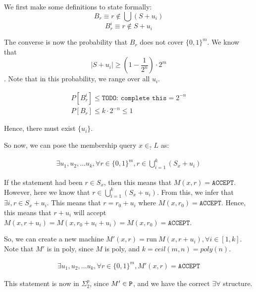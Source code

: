 We first make some definitions to state formally: 
$$B_r \equiv r \notin \bigcup (S + u_i)$$
 $$B_r^i \equiv r \notin S + u_i$$

The converse is now the probability that $B_r$ does not cover $\{0, 1\}^m$.  
We know that $$|S + u_i| \geq (1 - \frac{1}{2^n}) \cdot 2^m$$.
Note that in this probability, we range over all $u_i$.

\begin{align*}
    P[B_r^i] \leq \texttt{TODO: complete this} = 2^{-n} \\
    P[B_r] \leq  k \cdot 2^{-n} \leq 1
\end{align*}

Hence, there must exist $\{ u_i \}$.


So now, we can pose the membership query $x \in_? L$ as:

\begin{align*}
    \exists u_1, u_2, \dots u_k, \forall r \in \{0, 1\}^m, r \in \bigcup_{i = 1}^k (S_x + u_i)
\end{align*}

If the statement had been $r \in S_x$, then this means that $M(x, r) = \texttt{ACCEPT}$.
However, here we know that $r \in \bigcup_{i = 1}^k (S_x + u_i)$. From this, 
we infer that $\exists i, r \in S_x + u_i$.  This means
that $r = r_0 + u_i$ where $M(x, r_0) = \texttt{ACCEPT}$. Hence, this means
that $r + u_i$ will accept $M(x, r + u_i) = M(x, r_0 + u_i + u_i) = M(x, r_0) = \texttt{ACCEPT}$.

So, we can create a new machine $M'(x, r) = \text{run}~M(x, r + u_i),  \forall i \in [1, k]$.
Note that $M'$ is in poly, since $M$ is poly, and $k = ceil(m, n) = poly(n)$.

\begin{align*}
    \exists u_1, u_2, \dots u_k, \forall r \in \{0, 1\}^m, M'(x, r) = \texttt{ACCEPT}
\end{align*}

This statement is now in $\Sigma_2^p$, since $M' \in \texttt{P}$, and we have the correct
$\exists \forall$ structure.

